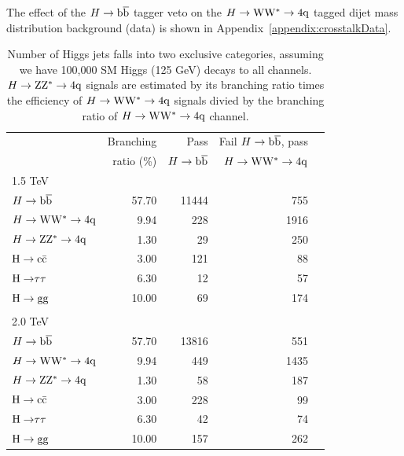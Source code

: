 The effect of the $H\to\mathrm{b\overline{b}}$ tagger veto on the $H\to{\rm W}{\rm W}^*\to4{\rm q}$ tagged dijet 
mass distribution
background (data) is shown in Appendix~\ref{appendix:crosstalkData}.


\begin{table}[htbp]
\begin{center}
\caption{Number of Higgs jets falls into two exclusive categories, assuming we have 100,000 SM Higgs (125 GeV) decays to all channels.
$H\to{\rm Z}{\rm Z}^*\to4{\rm q}$ signals are estimated by its branching ratio times the efficiency of $H\to{\rm W}{\rm W}^*\to4{\rm q}$ signals divied by the branching ratio of $H\to{\rm W}{\rm W}^*\to4{\rm q}$ channel. }
\begin{tabular}{|l|r|r|r|r|}
\hline
& Branching  & Pass       & Fail $H\to\mathrm{b\overline{b}}$, pass \\
& ratio (\%) & $H\to\mathrm{b\overline{b}}$  &   $H\to{\rm W}{\rm W}^*\to4{\rm q}$ \\ 
\hline
1.5 TeV  & & & \\
$H\to\mathrm{b\overline{b}}$ & 57.70 & 11444 &  755 \\ %
$H\to{\rm W}{\rm W}^*\to4{\rm q}$ & 9.94 & 228 & 1916 \\ %
$H\to{\rm Z}{\rm Z}^*\to4{\rm q}$ & 1.30 & 29 & 250 \\ %
${\rm H\to c\bar{c}}$ & 3.00 & 121 & 88 \\ %
${\rm H\to} \tau \tau$ & 6.30 & 12  & 57 \\ %
${\rm H\to gg}$ & 10.00 & 69 & 174 \\ %
\hline
\\
2.0 TeV &  & & \\ %
$H\to\mathrm{b\overline{b}}$ & 57.70 & 13816 & 551 \\ %
$H\to{\rm W}{\rm W}^*\to4{\rm q}$ & 9.94 & 449 & 1435 \\ %
$H\to{\rm Z}{\rm Z}^*\to4{\rm q}$ & 1.30 & 58 & 187 \\ %
${\rm H\to c\bar{c}}$ & 3.00 & 228 & 99 \\ %
${\rm H\to} \tau \tau$ & 6.30 & 42 & 74 \\ %
${\rm H\to gg}$ & 10.00 & 157  & 262 \\ \hline
\end{tabular}
\label{table:HbbHww}
\end{center}
\end{table}






